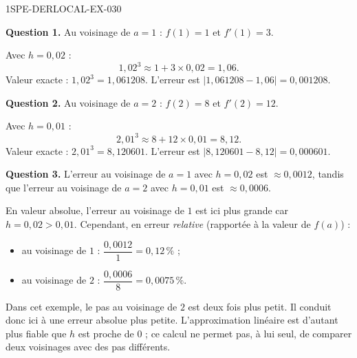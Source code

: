 \begin{corrige}{1SPE-DERLOCAL-EX-030}

\textbf{Question 1.} Au voisinage de $a = 1$ : $f(1) = 1$ et $f'(1) = 3$.

Avec $h = 0{,}02$ :
\[
1{,}02^3 \approx 1 + 3 \times 0{,}02 = \boxed{1{,}06}.
\]
Valeur exacte : $1{,}02^3 = 1{,}061208$. L'erreur est $|1{,}061208 - 1{,}06| = 0{,}001208$.

\textbf{Question 2.} Au voisinage de $a = 2$ : $f(2) = 8$ et $f'(2) = 12$.

Avec $h = 0{,}01$ :
\[
2{,}01^3 \approx 8 + 12 \times 0{,}01 = \boxed{8{,}12}.
\]
Valeur exacte : $2{,}01^3 = 8{,}120601$. L'erreur est $|8{,}120601 - 8{,}12| = 0{,}000601$.

\textbf{Question 3.} L'erreur au voisinage de $a = 1$ avec $h = 0{,}02$ est $\approx 0{,}0012$, tandis que l'erreur au voisinage de $a = 2$ avec $h = 0{,}01$ est $\approx 0{,}0006$.

En valeur absolue, l'erreur au voisinage de $1$ est ici plus grande car $h = 0{,}02 > 0{,}01$. Cependant, en erreur \emph{relative} (rapportée à la valeur de $f(a)$) :
\begin{itemize}
  \item au voisinage de $1$ : $\dfrac{0{,}0012}{1} = 0{,}12\,\%$ ;
  \item au voisinage de $2$ : $\dfrac{0{,}0006}{8} = 0{,}0075\,\%$.
\end{itemize}

Dans cet exemple, le pas au voisinage de $2$ est deux fois plus petit. Il conduit donc ici à une erreur absolue plus petite. L'approximation linéaire est d'autant plus fiable que $h$ est proche de $0$ ; ce calcul ne permet pas, à lui seul, de comparer deux voisinages avec des pas différents.

\end{corrige}
